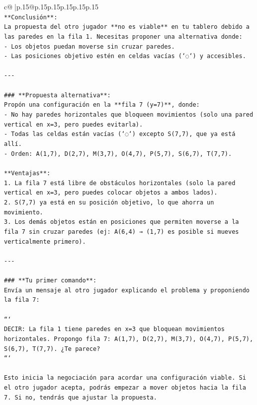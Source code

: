 \documentclass{article}
\begin{document}
{\begin{supertabular}{c@{$\;$}|p{.15\linewidth}@{}p{.15\linewidth}p{.15\linewidth}p{.15\linewidth}p{.15\linewidth}p{.15\linewidth}}
{{{\\ 
\texttt{**Conclusión**:} \\
\texttt{La propuesta del otro jugador **no es viable** en tu tablero debido a las paredes en la fila 1. Necesitas proponer una alternativa donde:} \\
\texttt{{-} Los objetos puedan moverse sin cruzar paredes.} \\
\texttt{{-} Las posiciones objetivo estén en celdas vacías (`◌`) y accesibles.} \\
\\ 
\texttt{{-}{-}{-}} \\
\\ 
\texttt{\#\#\# **Propuesta alternativa**:} \\
\texttt{Propón una configuración en la **fila 7 (y=7)**, donde:} \\
\texttt{{-} No hay paredes horizontales que bloqueen movimientos (solo una pared vertical en x=3, pero puedes evitarla).} \\
\texttt{{-} Todas las celdas están vacías (`◌`) excepto S(7,7), que ya está allí.} \\
\texttt{{-} Orden: A(1,7), D(2,7), M(3,7), O(4,7), P(5,7), S(6,7), T(7,7).} \\
\\ 
\texttt{**Ventajas**:} \\
\texttt{1. La fila 7 está libre de obstáculos horizontales (solo la pared vertical en x=3, pero puedes colocar objetos a ambos lados).} \\
\texttt{2. S(7,7) ya está en su posición objetivo, lo que ahorra un movimiento.} \\
\texttt{3. Los demás objetos están en posiciones que permiten moverse a la fila 7 sin cruzar paredes (ej: A(6,4) → (1,7) es posible si mueves verticalmente primero).} \\
\\ 
\texttt{{-}{-}{-}} \\
\\ 
\texttt{\#\#\# **Tu primer comando**:} \\
\texttt{Envía un mensaje al otro jugador explicando el problema y proponiendo la fila 7:} \\
\\ 
\texttt{```} \\
\texttt{DECIR: La fila 1 tiene paredes en x=3 que bloquean movimientos horizontales. Propongo fila 7: A(1,7), D(2,7), M(3,7), O(4,7), P(5,7), S(6,7), T(7,7). ¿Te parece?} \\
\texttt{```} \\
\\ 
\texttt{Esto inicia la negociación para acordar una configuración viable. Si el otro jugador acepta, podrás empezar a mover objetos hacia la fila 7. Si no, tendrás que ajustar la propuesta.} \\
            }
        }
    }
     \\ \\


\end{supertabular}}
\end{document}
